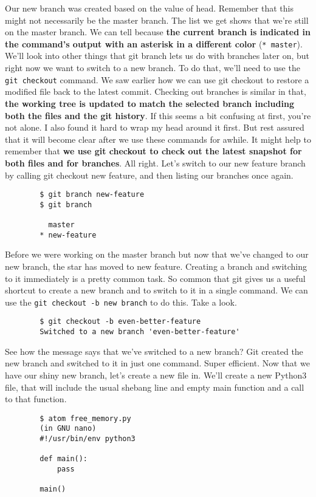 	
	Our new branch was created based on the value of head. Remember that this might not necessarily be the master branch. The list we get shows that we're still on the master branch. We can tell because \textbf{the current branch is indicated in the command's output with an asterisk in a different color} (\verb|* master|). We'll look into other things that git branch lets us do with branches later on, but right now we want to switch to a new branch. To do that, we'll need to use the\texttt{ git checkout} command. We saw earlier how we can use git checkout to restore a modified file back to the latest commit. Checking out branches is similar in that, \textbf{the working tree is updated to match the selected branch including both the files and the git history}. If this seems a bit confusing at first, you're not alone. I also found it hard to wrap my head around it first. But rest assured that it will become clear after we use these commands for awhile. It might help to remember that \textbf{we use git checkout to check out the latest snapshot for both files and for branches}. All right. Let's switch to our new feature branch by calling git checkout new feature, and then listing our branches once again.
	
	\begin{verbatim}
		$ git branch new-feature
		$ git branch
		
		  master
		* new-feature
	\end{verbatim}
	
	Before we were working on the master branch but now that we've changed to our new branch, the star has moved to new feature. Creating a branch and switching to it immediately is a pretty common task. So common that git gives us a useful shortcut to create a new branch and to switch to it in a single command. We can use the \verb|git checkout -b new branch| to do this. Take a look.
	
	\begin{verbatim}
		$ git checkout -b even-better-feature
		Switched to a new branch 'even-better-feature'
	\end{verbatim}

	See how the message says that we've switched to a new branch? Git created the new branch and switched to it in just one command. Super efficient. Now that we have our shiny new branch, let's create a new file in. We'll create a new Python3 file, that will include the usual shebang line and empty main function and a call to that function.
	
	\begin{verbatim}
		$ atom free_memory.py
		(in GNU nano)
		#!/usr/bin/env python3
	
		def main():
			pass
	
		main()
	\end{verbatim}
	
